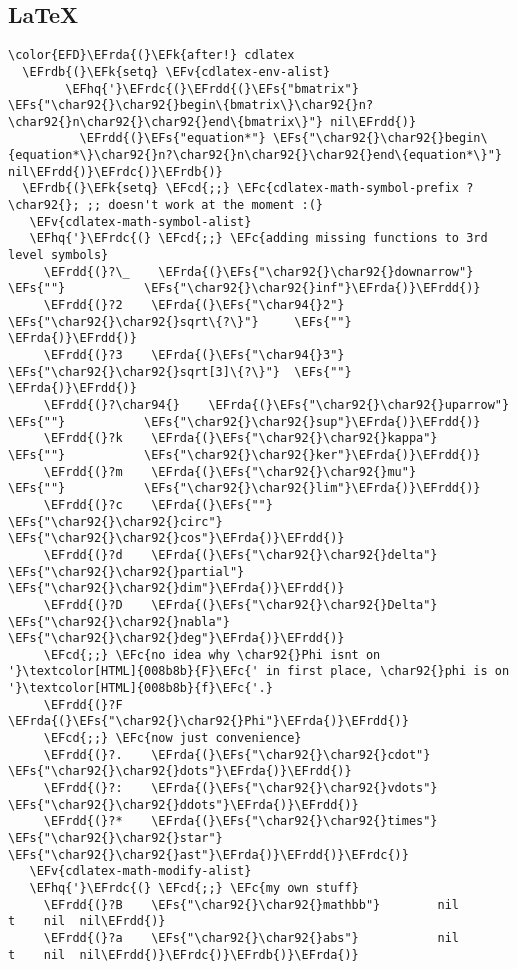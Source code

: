 \documentclass{article}
\newcommand{\EFc}[1]{\textcolor{EFc}{#1}} %
\newcommand{\EFcd}[1]{\textcolor{EFcd}{#1}} %
\newcommand{\EFs}[1]{\textcolor{EFs}{#1}} %
\newcommand{\EFk}[1]{\textcolor{EFk}{#1}} %
\newcommand{\EFv}[1]{\textcolor{EFv}{#1}} %
\newcommand{\EFhq}[1]{#1} %
\newcommand{\EFrda}[1]{\textcolor{EFrda}{#1}} %
\newcommand{\EFrdb}[1]{\textcolor{EFrdb}{#1}} %
\newcommand{\EFrdc}[1]{\textcolor{EFrdc}{#1}} %
\newcommand{\EFrdd}[1]{\textcolor{EFrdd}{#1}} %
\begin{document}
\subsection{\LaTeX{}}
\label{sec:orgb58e1e8}
\begin{Code}
\begin{Verbatim}
\color{EFD}\EFrda{(}\EFk{after!} cdlatex
  \EFrdb{(}\EFk{setq} \EFv{cdlatex-env-alist}
        \EFhq{'}\EFrdc{(}\EFrdd{(}\EFs{"bmatrix"} \EFs{"\char92{}\char92{}begin\{bmatrix\}\char92{}n?\char92{}n\char92{}\char92{}end\{bmatrix\}"} nil\EFrdd{)}
          \EFrdd{(}\EFs{"equation*"} \EFs{"\char92{}\char92{}begin\{equation*\}\char92{}n?\char92{}n\char92{}\char92{}end\{equation*\}"} nil\EFrdd{)}\EFrdc{)}\EFrdb{)}
  \EFrdb{(}\EFk{setq} \EFcd{;;} \EFc{cdlatex-math-symbol-prefix ?\char92{}; ;; doesn't work at the moment :(}
   \EFv{cdlatex-math-symbol-alist}
   \EFhq{'}\EFrdc{(} \EFcd{;;} \EFc{adding missing functions to 3rd level symbols}
     \EFrdd{(}?\_    \EFrda{(}\EFs{"\char92{}\char92{}downarrow"}  \EFs{""}           \EFs{"\char92{}\char92{}inf"}\EFrda{)}\EFrdd{)}
     \EFrdd{(}?2    \EFrda{(}\EFs{"\char94{}2"}           \EFs{"\char92{}\char92{}sqrt\{?\}"}     \EFs{""}     \EFrda{)}\EFrdd{)}
     \EFrdd{(}?3    \EFrda{(}\EFs{"\char94{}3"}           \EFs{"\char92{}\char92{}sqrt[3]\{?\}"}  \EFs{""}     \EFrda{)}\EFrdd{)}
     \EFrdd{(}?\char94{}    \EFrda{(}\EFs{"\char92{}\char92{}uparrow"}    \EFs{""}           \EFs{"\char92{}\char92{}sup"}\EFrda{)}\EFrdd{)}
     \EFrdd{(}?k    \EFrda{(}\EFs{"\char92{}\char92{}kappa"}      \EFs{""}           \EFs{"\char92{}\char92{}ker"}\EFrda{)}\EFrdd{)}
     \EFrdd{(}?m    \EFrda{(}\EFs{"\char92{}\char92{}mu"}         \EFs{""}           \EFs{"\char92{}\char92{}lim"}\EFrda{)}\EFrdd{)}
     \EFrdd{(}?c    \EFrda{(}\EFs{""}             \EFs{"\char92{}\char92{}circ"}     \EFs{"\char92{}\char92{}cos"}\EFrda{)}\EFrdd{)}
     \EFrdd{(}?d    \EFrda{(}\EFs{"\char92{}\char92{}delta"}      \EFs{"\char92{}\char92{}partial"}  \EFs{"\char92{}\char92{}dim"}\EFrda{)}\EFrdd{)}
     \EFrdd{(}?D    \EFrda{(}\EFs{"\char92{}\char92{}Delta"}      \EFs{"\char92{}\char92{}nabla"}    \EFs{"\char92{}\char92{}deg"}\EFrda{)}\EFrdd{)}
     \EFcd{;;} \EFc{no idea why \char92{}Phi isnt on '}\textcolor[HTML]{008b8b}{F}\EFc{' in first place, \char92{}phi is on '}\textcolor[HTML]{008b8b}{f}\EFc{'.}
     \EFrdd{(}?F    \EFrda{(}\EFs{"\char92{}\char92{}Phi"}\EFrda{)}\EFrdd{)}
     \EFcd{;;} \EFc{now just convenience}
     \EFrdd{(}?.    \EFrda{(}\EFs{"\char92{}\char92{}cdot"} \EFs{"\char92{}\char92{}dots"}\EFrda{)}\EFrdd{)}
     \EFrdd{(}?:    \EFrda{(}\EFs{"\char92{}\char92{}vdots"} \EFs{"\char92{}\char92{}ddots"}\EFrda{)}\EFrdd{)}
     \EFrdd{(}?*    \EFrda{(}\EFs{"\char92{}\char92{}times"} \EFs{"\char92{}\char92{}star"} \EFs{"\char92{}\char92{}ast"}\EFrda{)}\EFrdd{)}\EFrdc{)}
   \EFv{cdlatex-math-modify-alist}
   \EFhq{'}\EFrdc{(} \EFcd{;;} \EFc{my own stuff}
     \EFrdd{(}?B    \EFs{"\char92{}\char92{}mathbb"}        nil          t    nil  nil\EFrdd{)}
     \EFrdd{(}?a    \EFs{"\char92{}\char92{}abs"}           nil          t    nil  nil\EFrdd{)}\EFrdc{)}\EFrdb{)}\EFrda{)}
\end{Verbatim}
\end{Code}
\end{document}
